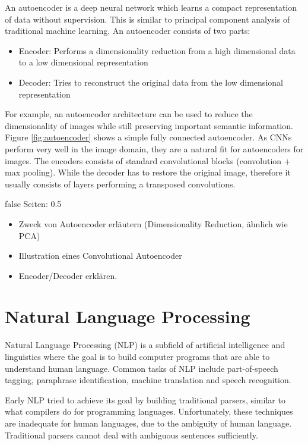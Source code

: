 \documentclass[draft,final,oneside]{vutinfth} %
\begin{document}
An autoencoder is a deep neural network which learns a compact representation of data without supervision. This is similar to principal component analysis of traditional machine learning. An autoencoder consists of two parts: 

\begin{itemize}
\item Encoder: Performs a dimensionality reduction from a high dimensional data to a low dimensional representation
\item Decoder: Tries to reconstruct the original data from the low dimensional representation
\end{itemize}

For example, an autoencoder architecture can be used to reduce the dimensionality of images while still preserving important semantic information. Figure \ref{fig:autoencoder} shows a simple fully connected autoencoder. As CNNs perform very well in the image domain, they are a natural fit for autoencoders for images. The encoders consists of standard convolutional blocks (convolution + max pooling). While the decoder has to restore the original image, therefore it usually consists of layers performing a transposed convolutions.

\if false
Seiten: 0.5
\begin{itemize}
\item Zweck von Autoencoder erläutern (Dimensionality Reduction, ähnlich wie PCA)
\item Illustration eines Convolutional Autoencoder
\item Encoder/Decoder erklären.
\end{itemize}
\fi


\section{Natural Language Processing} \label{nlpbackground}

Natural Language Processing (NLP) is a subfield of artificial intelligence and linguistics where the goal is to build computer programs that are able to understand human language. Common tasks of NLP include part-of-speech tagging, paraphrase identification, machine translation and speech recognition.

Early NLP tried to achieve its goal by building traditional parsers, similar to what compilers do for programming languages. Unfortunately, these techniques are inadequate for human languages, due to the ambiguity of human language. Traditional parsers cannot deal with ambiguous sentences sufficiently.
\end{document}
